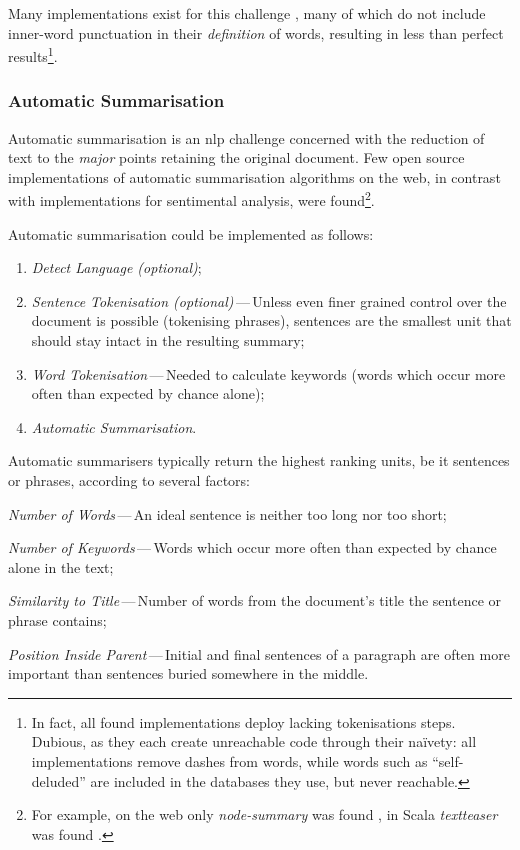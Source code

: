 Many implementations exist for this challenge
  \autocites{thinkroth/sentimental-source-code}{mileszim/sediment-source-code}
  {thisandagain/sentiment-source-code}, many of which do not include
  inner-word punctuation in their \emph{definition} of words, resulting in
  less than perfect results\footnote{In fact, all found implementations
      deploy lacking tokenisations steps.
    Dubious, as they each create unreachable code through their na\"ivety:
      all implementations remove dashes from words, while words such as
      ``self-deluded'' are included in the databases they use, but never
      reachable.}.

\subsubsection{Automatic Summarisation}\label{automatic-summarisation}

Automatic summarisation is an \gls{nlp} challenge concerned with the reduction
  of text to the \emph{major} points retaining the original document.
Few open source implementations of automatic summarisation algorithms on
  the web, in contrast with implementations for sentimental analysis, were
  found\footnote{For example, on the web only \emph{node-summary} was found
    \autocite{jbrooksuk/node-summary-source-code}, in Scala \emph{textteaser}
    was found \autocite{MojoJolo/textteaser-source-code}.}.

Automatic summarisation could be implemented as follows:

\begin{enumerate}
\item\emph{Detect Language (optional)};
\item\emph{Sentence Tokenisation (optional)}\,---\,Unless even finer grained
  control over the document is possible (tokenising phrases), sentences are
  the smallest unit that should stay intact in the resulting summary;
\item\emph{Word Tokenisation}\,---\,Needed to calculate keywords (words
  which occur more often than expected by chance alone);
\item\emph{Automatic Summarisation}.
\end{enumerate}

\noindent Automatic summarisers typically return the highest ranking units,
  be it sentences or phrases, according to several factors:

\begin{aenumerate}
\item\emph{Number of Words}\,---\,An ideal sentence is neither too long nor
  too short;
\item\emph{Number of Keywords}\,---\,Words which occur more often than
  expected by chance alone in the text;
\item\emph{Similarity to Title}\,---\,Number of words from the document's
  title the sentence or phrase contains;
\item\emph{Position Inside Parent}\,---\,Initial and final sentences of a
  paragraph are often more important than sentences buried somewhere in
  the middle.
\end{aenumerate}

